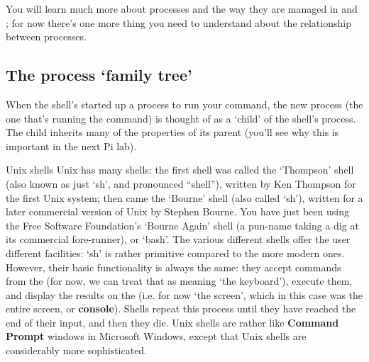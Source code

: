 You will learn much more about processes and the way they are managed in  and ; for now there's one more thing you need to understand about the relationship between processes.

\subsection{The process `family tree'}
\label{section:family-tree}

When the shell's started up a process to run your command, the new process (the one that's running the command) is thought of as a `child' of the shell's process. The child inherits many of the properties of its parent (you'll see why this is important in the next Pi lab).



\begin{diversion}{Unix shells}
Unix has many shells: the first shell was called the `Thompson' shell (also known as just `sh', and pronounced ``shell''), written by Ken Thompson for the first Unix system; then came the `Bourne' shell (also called `sh'), written for a later commercial version of Unix by Stephen Bourne. You have just been using the Free Software Foundation's `Bourne Again' shell (a pun-name taking a dig at its commercial fore-runner), or `bash'. The various different shells offer the user different facilities: `sh' is rather
primitive compared to the more modern ones. However, their basic
functionality is always the same: they accept commands from the
 (for now, we can treat that as meaning `the keyboard'), execute them, and display
the results on the  (i.e. for now `the screen', which in
this case was the entire screen, or \textbf{console}). Shells repeat
this process until they have reached the end of their input, and then
they die. Unix shells are rather like \textbf{Command Prompt} windows in Microsoft
Windows, except that Unix shells are considerably more sophisticated.
\end{diversion}



